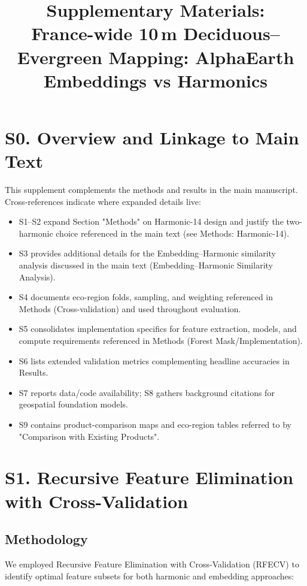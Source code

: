 \documentclass[utf8]{frontiers_suppmat}
\begin{document}
\onecolumn
{}

\title{Supplementary Materials:\\France-wide 10\,m Deciduous–Evergreen Mapping: AlphaEarth Embeddings vs Harmonics}

\maketitle

\section{S0. Overview and Linkage to Main Text}

This supplement complements the methods and results in the main manuscript. Cross-references indicate where expanded details live:

\begin{itemize}
    \item S1–S2 expand Section "Methods" on Harmonic-14 design and justify the two-harmonic choice referenced in the main text (see Methods: Harmonic-14).
    \item S3 provides additional details for the Embedding–Harmonic similarity analysis discussed in the main text (Embedding–Harmonic Similarity Analysis).
    \item S4 documents eco-region folds, sampling, and weighting referenced in Methods (Cross-validation) and used throughout evaluation.
    \item S5 consolidates implementation specifics for feature extraction, models, and compute requirements referenced in Methods (Forest Mask/Implementation).
    \item S6 lists extended validation metrics complementing headline accuracies in Results.
    \item S7 reports data/code availability; S8 gathers background citations for geospatial foundation models.
    \item S9 contains product-comparison maps and eco-region tables referred to by "Comparison with Existing Products".
\end{itemize}

\section{S1. Recursive Feature Elimination with Cross-Validation}

\subsection{Methodology}
We employed Recursive Feature Elimination with Cross-Validation (RFECV) to identify optimal feature subsets for both harmonic and embedding approaches:
\end{document}
